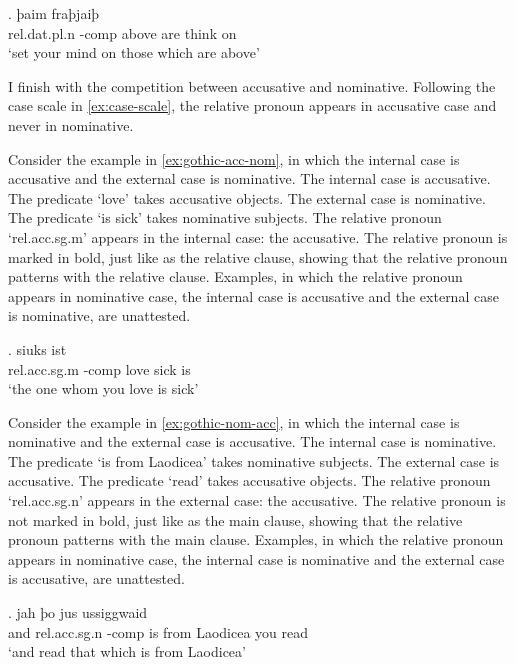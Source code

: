 \exg. þaim    fraþjaiþ \\
 \ac{rel}.\ac{dat}.\ac{pl}.\ac{n} -\ac{comp} above are\scsub{[nom]} {think on}\scsub{[dat]}\\
 `set your mind on those which are above' \label{ex:gothic-nom-dat}

I finish with the competition between accusative and nominative. Following the case scale in \ref{ex:case-scale}, the relative pronoun appears in accusative case and never in nominative.

Consider the example in \ref{ex:gothic-acc-nom}, in which the internal case is accusative and the external case is nominative.
The internal case is accusative. The predicate  `love' takes accusative objects.
The external case is nominative. The predicate  `is sick' takes nominative subjects.
The relative pronoun  `\ac{rel}.\ac{acc}.\ac{sg}.\ac{m}' appears in the internal case: the accusative. The relative pronoun is marked in bold, just like as the relative clause, showing that the relative pronoun patterns with the relative clause.
Examples, in which the relative pronoun appears in nominative case, the internal case is accusative and the external case is nominative, are unattested.

\exg.    siuks ist\\
 \ac{rel}.\ac{acc}.\ac{sg}.\ac{m} -\ac{comp} love\scsub{[acc]} sick is\scsub{[nom]}\\
 `the one whom you love is sick' \label{ex:gothic-acc-nom}

Consider the example in \ref{ex:gothic-nom-acc}, in which the internal case is nominative and the external case is accusative.
The internal case is nominative. The predicate  `is from Laodicea' takes nominative subjects.
The external case is accusative. The predicate  `read' takes accusative objects.
The relative pronoun  `\ac{rel}.\ac{acc}.\ac{sg}.\ac{n}' appears in the external case: the accusative. The relative pronoun is not marked in bold, just like as the main clause, showing that the relative pronoun patterns with the main clause.
Examples, in which the relative pronoun appears in nominative case, the internal case is nominative and the external case is accusative, are unattested.

\exg. jah þo     jus ussiggwaid\\
 and \ac{rel}.\ac{acc}.\ac{sg}.\ac{n} -\ac{comp} is\scsub{[nom]} from Laodicea you read\scsub{[acc]}\\
 `and read that which is from Laodicea' \label{ex:gothic-nom-acc}

